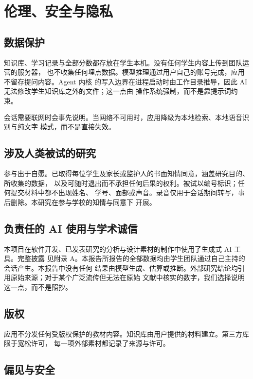 \documentclass[11pt,a4paper,UTF8,fontset=windows]{ctexart}
\begin{document}
\section{伦理、安全与隐私}

\subsection{数据保护}

知识库、学习记录与全部分数都存放在学生本机。没有任何学生内容上传到团队运营的服务器，
也不收集任何埋点数据。模型推理通过用户自己的账号完成，应用不留存提问内容。Agent 内核
的写入边界在进程启动时由工作目录推导，因此 AI 无法修改学生知识库之外的文件；这一点由
操作系统强制，而不是靠提示词约束。

会话需要联网时会事先说明。当网络不可用时，应用降级为本地检索、本地语音识别与纯文字
模式，而不是直接失效。

\subsection{涉及人类被试的研究}

参与出于自愿。已取得每位学生及家长或监护人的书面知情同意，涵盖研究目的、所收集的数据，
以及可随时退出而不承担任何后果的权利。被试以编号标识；任何提交材料中都不出现姓名、
学号、面部或声音。录音仅用于会话期间转写，事后删除。本研究在参与学校的知情与同意下
开展。

\subsection{负责任的 AI 使用与学术诚信}

本项目在软件开发、已发表研究的分析与设计素材的制作中使用了生成式 AI 工具。完整披露
见附录 A。本报告所报告的全部数据均由学生团队通过自己主持的会话产生。本报告中没有任何
结果由模型生成、估算或推断。外部研究结论均引用原始来源；对于某个广泛流传但无法在原始
文献中核实的数字，我们选择说明这一点，而不是照抄。

\subsection{版权}

应用不分发任何受版权保护的教材内容。知识库由用户提供的材料建立。第三方库限于宽松许可，
每一项外部素材都记录了来源与许可。

\subsection{偏见与安全}
\end{document}

